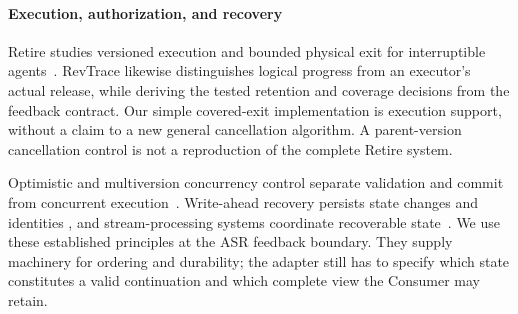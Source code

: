 \paragraph{Execution, authorization, and recovery}
Retire studies versioned execution and bounded physical exit for
interruptible agents~\cite{zhang2026retire}. RevTrace likewise distinguishes
logical progress from an executor's actual release, while deriving the
tested retention and coverage decisions from the feedback contract. Our
simple covered-exit implementation is execution support, without a claim
to a new general cancellation algorithm. A parent-version cancellation
control is not a reproduction of the complete Retire system.

Optimistic and multiversion concurrency control separate validation and
commit from concurrent execution~\cite{kung1981occ,bernstein1983mvcc}.
Write-ahead recovery persists state changes and identities
\cite{mohan1992aries}, and stream-processing systems coordinate recoverable
state~\cite{carbone2017flinkstate}. We use these established principles at
the ASR feedback boundary. They supply machinery for ordering and
durability; the adapter still has to specify which state constitutes a
valid continuation and which complete view the Consumer may retain.
